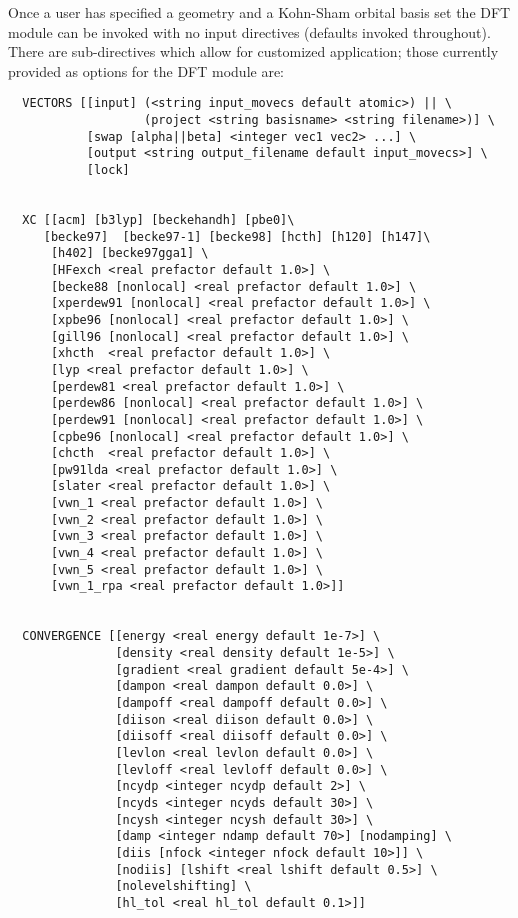 Once a user has specified a geometry and a Kohn-Sham orbital basis set
the DFT module can be invoked with no input directives (defaults 
invoked throughout).  There are sub-directives which allow for 
customized application; those currently provided as options for 
the DFT module are:
\begin{verbatim}
  VECTORS [[input] (<string input_movecs default atomic>) || \
                   (project <string basisname> <string filename>)] \
           [swap [alpha||beta] <integer vec1 vec2> ...] \
           [output <string output_filename default input_movecs>] \
           [lock]


  XC [[acm] [b3lyp] [beckehandh] [pbe0]\
     [becke97]  [becke97-1] [becke98] [hcth] [h120] [h147]\
      [h402] [becke97gga1] \
      [HFexch <real prefactor default 1.0>] \
      [becke88 [nonlocal] <real prefactor default 1.0>] \
      [xperdew91 [nonlocal] <real prefactor default 1.0>] \
      [xpbe96 [nonlocal] <real prefactor default 1.0>] \
      [gill96 [nonlocal] <real prefactor default 1.0>] \
      [xhcth  <real prefactor default 1.0>] \
      [lyp <real prefactor default 1.0>] \
      [perdew81 <real prefactor default 1.0>] \
      [perdew86 [nonlocal] <real prefactor default 1.0>] \
      [perdew91 [nonlocal] <real prefactor default 1.0>] \
      [cpbe96 [nonlocal] <real prefactor default 1.0>] \
      [chcth  <real prefactor default 1.0>] \
      [pw91lda <real prefactor default 1.0>] \
      [slater <real prefactor default 1.0>] \
      [vwn_1 <real prefactor default 1.0>] \
      [vwn_2 <real prefactor default 1.0>] \
      [vwn_3 <real prefactor default 1.0>] \
      [vwn_4 <real prefactor default 1.0>] \
      [vwn_5 <real prefactor default 1.0>] \
      [vwn_1_rpa <real prefactor default 1.0>]]


  CONVERGENCE [[energy <real energy default 1e-7>] \
               [density <real density default 1e-5>] \
               [gradient <real gradient default 5e-4>] \
               [dampon <real dampon default 0.0>] \
               [dampoff <real dampoff default 0.0>] \
               [diison <real diison default 0.0>] \
               [diisoff <real diisoff default 0.0>] \
               [levlon <real levlon default 0.0>] \
               [levloff <real levloff default 0.0>] \
               [ncydp <integer ncydp default 2>] \
               [ncyds <integer ncyds default 30>] \
               [ncysh <integer ncysh default 30>] \
               [damp <integer ndamp default 70>] [nodamping] \
               [diis [nfock <integer nfock default 10>]] \
               [nodiis] [lshift <real lshift default 0.5>] \
               [nolevelshifting] \
               [hl_tol <real hl_tol default 0.1>]]



\end{verbatim}
